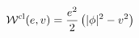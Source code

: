 \begin{equation}
{\cal W}^{\rm cl}(e,v)=\frac{e^2}2 \left( |\phi |^2 -v^2 \right) 
\label{Wclass}
\end{equation}

